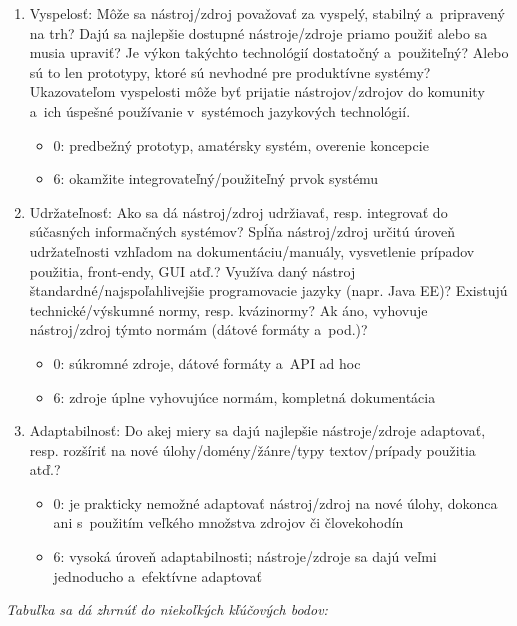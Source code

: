 \begin{multicols}{2}
\begin{enumerate}
\begin{itemize}
\end{itemize}
\item Vyspelosť: Môže sa nástroj/zdroj považovať za vyspelý, stabilný a~pripravený na trh? Dajú sa najlepšie dostupné nástroje/zdroje priamo použiť alebo sa musia upraviť? Je výkon takýchto technológií dostatočný a~použiteľný? Alebo sú to len prototypy, ktoré sú nevhodné pre produktívne systémy? Ukazovateľom vyspelosti môže byť prijatie nástrojov/zdrojov do komunity a~ich úspešné používanie v~systémoch jazykových technológií.
\begin{itemize}
\item 0: predbežný prototyp, amatérsky systém, overenie koncepcie
\item 6: okamžite integrovateľný/po\-u\-ži\-teľný prvok systému
\end{itemize}
\item Udržateľnosť: Ako sa dá nástroj/zdroj udržiavať, resp. integrovať do súčasných informačných systémov? Spĺňa nástroj/zdroj určitú úroveň udržateľnosti vzhľadom na dokumentáciu/manuály, vysvetlenie prípadov použitia, front‑endy, GUI atď.? Využíva daný nástroj štandardné/najspoľahlivejšie programovacie jazyky (napr. Java EE)? Existujú technické/výskumné normy, resp. kvázinormy? Ak áno, vyhovuje nástroj/zdroj týmto normám (dátové formáty a~pod.)?
\begin{itemize}
\item 0: súkromné zdroje, dátové formáty a~API ad hoc
\item 6: zdroje úplne vyhovujúce normám, kompletná dokumentácia
\end{itemize}
\item Adaptabilnosť: Do akej miery sa dajú najlepšie nástroje/zdroje adaptovať, resp. rozšíriť na nové úlohy/domény/žánre/typy textov/prí\-pa\-dy použitia atď.?
\begin{itemize}
\item 0: je prakticky nemožné adaptovať nástroj/zdroj na nové úlohy, dokonca ani s~použitím veľkého množstva zdrojov či človekohodín
\item 6: vysoká úroveň adaptabilnosti; nástroje/zdroje sa dajú veľmi jednoducho a~efektívne adaptovať
\end{itemize}
\end{enumerate}

\emph{Tabuľka sa dá zhrnúť do niekoľkých kľúčových bodov:}


\end{multicols}

